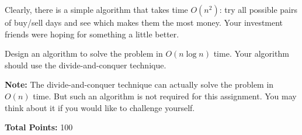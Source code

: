\documentclass[11pt]{article}
\begin{document}
\begin{enumerate}
Clearly, there is a simple algorithm that takes time $O(n^2)$: try all possible pairs of buy/sell days and see which makes them the most money. Your investment friends were hoping for something a little better.

Design an algorithm to solve the problem in $O(n\log n)$ time. Your algorithm should use the divide-and-conquer technique.


{\bf Note:} The divide-and-conquer technique can actually solve the problem in $O(n)$ time. But such an algorithm is not required for this assignment. You may think about it if you would like to challenge yourself.
\end{enumerate}


{\bf Total Points:} 100
\end{document}
